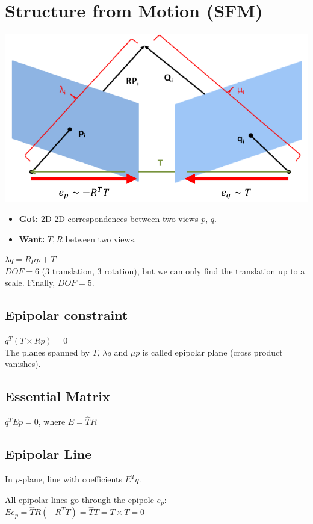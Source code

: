\section{Structure from Motion (SFM)}
\includegraphics[width=\linewidth]{Images/SFM.png}
\begin{itemize}
  \item \textbf{Got:} 2D-2D correspondences between two views $p$, $q$.
  \item \textbf{Want:} $T, R$ between two views.
\end{itemize}
$\lambda q = R \mu p + T$\\
$DOF = 6$ (3 translation, 3 rotation), but 
we can only find the translation up to a scale. Finally, $DOF = 5$.

\subsection*{Epipolar constraint}
$q^T ( T \times R p) = 0$\\
The planes spanned by $T$, $\lambda q$ and $\mu p$ is called epipolar
plane (cross product vanishes).

\subsection*{Essential Matrix}
$q^T E p = 0$, where $E = \hat{T} R$

\subsection*{Epipolar Line}
In $p$-plane, line with coefficients $E^T q$.

All epipolar lines go through the epipole $e_p$:\\
$E e_p = \hat{T} R (-R^T T) = \hat{T}T = T \times T = 0$

